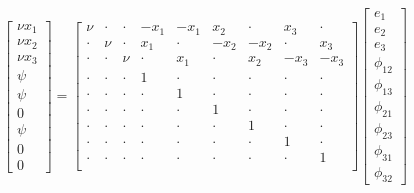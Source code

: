 \begin{equation}\label{eq:sys-Eaton2014}
\left[\begin{array}{c}
  \nu x_1 \\
  \nu x_2 \\
  \nu x_3 \\
   \psi   \\
   \psi   \\
     0    \\
   \psi   \\
     0    \\
     0
\end{array}\right]
=
\left[\begin{array}{ccccccccc}
   \nu  & \cdot & \cdot & -x_1  & -x_1  &  x_2  & \cdot &  x_3  & \cdot \\
  \cdot &  \nu  & \cdot &  x_1  & \cdot & -x_2  & -x_2  & \cdot &  x_3  \\
  \cdot & \cdot &  \nu  & \cdot &  x_1  & \cdot &  x_2  & -x_3  & -x_3  \\
  \cdot & \cdot & \cdot &   1   & \cdot & \cdot & \cdot & \cdot & \cdot \\
  \cdot & \cdot & \cdot & \cdot &   1   & \cdot & \cdot & \cdot & \cdot \\
  \cdot & \cdot & \cdot & \cdot & \cdot &   1   & \cdot & \cdot & \cdot \\
  \cdot & \cdot & \cdot & \cdot & \cdot & \cdot &   1   & \cdot & \cdot \\
  \cdot & \cdot & \cdot & \cdot & \cdot & \cdot & \cdot &   1   & \cdot \\
  \cdot & \cdot & \cdot & \cdot & \cdot & \cdot & \cdot & \cdot &   1   \\
\end{array}\right]
\left[\begin{array}{c}
     e_1    \\
     e_2    \\
     e_3    \\
  \phi_{12} \\
  \phi_{13} \\
  \phi_{21} \\
  \phi_{23} \\
  \phi_{31} \\
  \phi_{32}
\end{array}\right]
\end{equation}